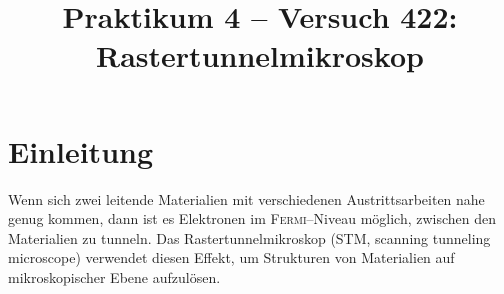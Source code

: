 \documentclass[sn-mathphys-num,iicol]{sn-jnl}
\theoremstyle{thmstyleone}
\theoremstyle{thmstyletwo}
\theoremstyle{thmstylethree}
\begin{document}
        
\title[]{Praktikum 4 -- Versuch 422: Rastertunnelmikroskop}
\author*[1]{ }
\author*[2]{ }

\maketitle

\section{Einleitung}
Wenn sich zwei leitende Materialien mit verschiedenen Austrittsarbeiten nahe genug kommen, dann ist es Elektronen im \textsc{Fermi}--Niveau möglich, zwischen den Materialien zu tunneln.
Das Rastertunnelmikroskop (STM, scanning tunneling microscope) verwendet diesen Effekt, um Strukturen von Materialien auf mikroskopischer Ebene aufzulösen.
\end{document}
